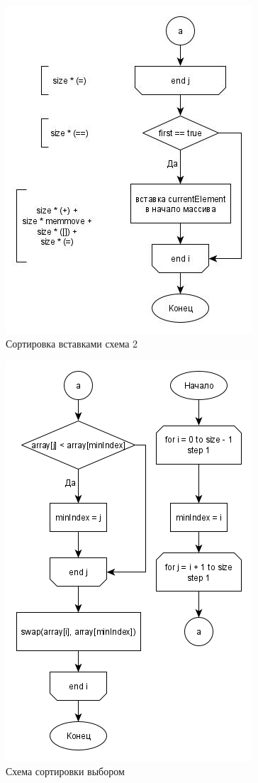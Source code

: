 \begin{figure}[H]
	\centering
	\includegraphics[width=0.7\linewidth]{../Рисунки/insertion2}
	\caption{Сортировка вставками схема 2}
	\label{fig:insertion2}
\end{figure}


\begin{figure}[H]
	\centering
	\includegraphics[width=0.7\linewidth]{../Рисунки/selection}
	\caption{Схема сортировки выбором}
	\label{fig:selection}
\end{figure}